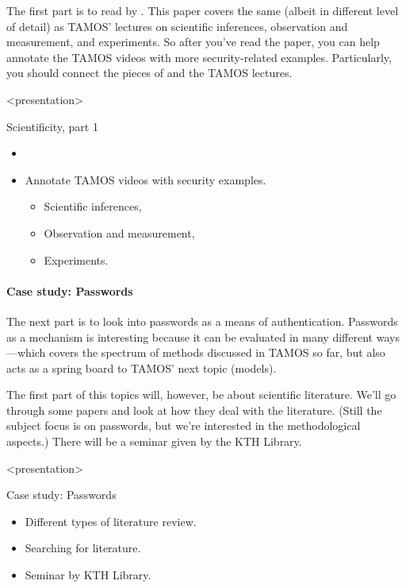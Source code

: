 The first part is to read  by 
\textcite{HowToDesignSecurityExperiments}.
This paper covers the same (albeit in different level of detail) as TAMOS' 
lectures on
scientific inferences,
observation and measurement,
and experiments.
So after you've read the paper, you can help annotate the TAMOS videos with 
more security-related examples.
Particularly, you should connect the pieces of 
 and the TAMOS lectures.

\begin{frame}<presentation>
  \begin{block}{Scientificity, part 1}
    \begin{itemize}
      \item {}
      \item Annotate TAMOS videos with security examples.
        \begin{itemize}
          \item Scientific inferences,
          \item Observation and measurement,
          \item Experiments.
        \end{itemize}
    \end{itemize}
  \end{block}
\end{frame}

\paragraph{Case study: Passwords}

The next part is to look into passwords as a means of authentication.
Passwords as a mechanism is interesting because it can be evaluated in many 
different ways---which covers the spectrum of methods discussed in TAMOS so 
far, but also acts as a spring board to TAMOS' next topic (models).

The first part of this topics will, however, be about scientific literature.
We'll go through some papers and look at how they deal with the literature.
(Still the subject focus is on passwords, but we're interested in the 
methodological aspects.)
There will be a seminar given by the KTH Library.

\begin{frame}<presentation>
  \begin{block}{Case study: Passwords}
    \begin{itemize}
      \item Different types of literature review.
      \item Searching for literature.
      \item Seminar by KTH Library.
    \end{itemize}
  \end{block}
\end{frame}

